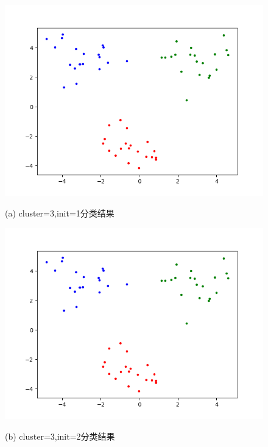 \documentclass{article}
\begin{document}
 \begin{figure}[htbp]
 	\begin{minipage}{0.48\linewidth}
 		\centerline{\includegraphics[width=0.7\linewidth]{img//sc1.png}}
 		\centerline{(a) cluster=3,init=1分类结果}
 	\end{minipage}
 	\begin{minipage}{.48\linewidth}
 		\centerline{\includegraphics[width=0.7\linewidth]{img//sc1.png}}
 		\centerline{(b)  cluster=3,init=2分类结果}
 	\end{minipage}
 	

\end{figure}
\end{document}
